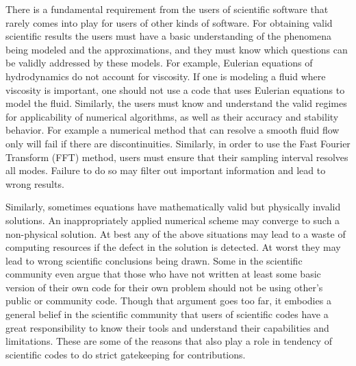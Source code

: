 \label{sec:using}
There is a fundamental requirement from the users of scientific
software that rarely comes into play for users of other kinds of
software. For obtaining valid scientific results the users must 
have a basic understanding of the phenomena being modeled and the
approximations, and they must know which questions can be validly 
addressed by these models. For example, Eulerian equations of
hydrodynamics do not account for viscosity. If one is modeling a fluid
where viscosity is important, one should not use a code that uses
Eulerian equations to model the fluid. Similarly, the users must know and
understand the valid regimes for applicability of numerical
algorithms, as well as their accuracy and stability behavior. For
example a numerical method that can resolve a smooth 
fluid flow only will fail if there are discontinuities. Similarly, in
order to use the Fast Fourier Transform (FFT) method, users must
ensure that their sampling interval resolves all modes. Failure to do
so may filter out important information and lead to wrong results.

Similarly, sometimes equations have mathematically valid but
physically invalid solutions. An inappropriately applied numerical scheme may
converge to such a non-physical solution. At best any of the above
situations may lead to a waste of computing resources if the defect in
the solution is detected. At worst they may lead to wrong scientific
conclusions being drawn. Some in the scientific community even argue
that those who have not written at least some basic version of their
own code for their own problem should not be using other's public or
community code. Though that argument goes too far, it embodies a
general belief in the scientific community that users of scientific
codes have a great responsibility to know their tools and understand
their capabilities and limitations. 
These are some of the reasons that also play a role in tendency of scientific
codes to do strict gatekeeping for contributions.

